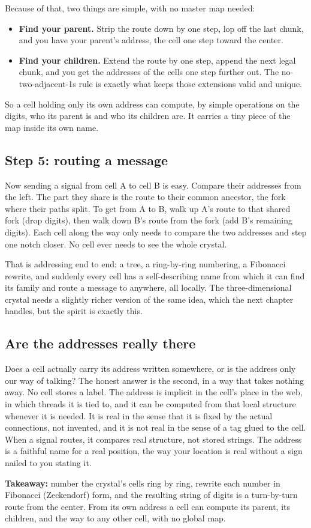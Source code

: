 Because of that, two things are simple, with no master map needed:

\begin{itemize}
\item \textbf{Find your parent.} Strip the route down by one step, lop off the last chunk, and you have your parent's address, the cell one step toward the center.
\item \textbf{Find your children.} Extend the route by one step, append the next legal chunk, and you get the addresses of the cells one step further out. The no-two-adjacent-1s rule is exactly what keeps those extensions valid and unique.
\end{itemize}

So a cell holding only its own address can compute, by simple operations on the digits, who its parent is and who its children are. It carries a tiny piece of the map inside its own name.

\subsection{Step 5: routing a message}

Now sending a signal from cell A to cell B is easy. Compare their addresses from the left. The part they share is the route to their common ancestor, the fork where their paths split. To get from A to B, walk up A's route to that shared fork (drop digits), then walk down B's route from the fork (add B's remaining digits). Each cell along the way only needs to compare the two addresses and step one notch closer. No cell ever needs to see the whole crystal.

That is addressing end to end: a tree, a ring-by-ring numbering, a Fibonacci rewrite, and suddenly every cell has a self-describing name from which it can find its family and route a message to anywhere, all locally. The three-dimensional crystal needs a slightly richer version of the same idea, which the next chapter handles, but the spirit is exactly this.

\subsection{Are the addresses really there}

Does a cell actually carry its address written somewhere, or is the address only our way of talking? The honest answer is the second, in a way that takes nothing away. No cell stores a label. The address is implicit in the cell's place in the web, in which threads it is tied to, and it can be computed from that local structure whenever it is needed. It is real in the sense that it is fixed by the actual connections, not invented, and it is not real in the sense of a tag glued to the cell. When a signal routes, it compares real structure, not stored strings. The address is a faithful name for a real position, the way your location is real without a sign nailed to you stating it.

\textbf{Takeaway:} number the crystal's cells ring by ring, rewrite each number in Fibonacci (Zeckendorf) form, and the resulting string of digits is a turn-by-turn route from the center. From its own address a cell can compute its parent, its children, and the way to any other cell, with no global map.
